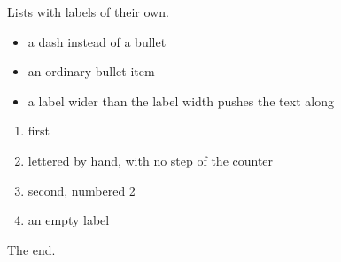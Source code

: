 \documentclass{article}
\begin{document}
Lists with labels of their own.
\begin{itemize}
\item[--] a dash instead of a bullet
\item an ordinary bullet item
\item[Note:] a label wider than the label width pushes the text along
\end{itemize}
\begin{enumerate}
\item first
\item[(a)] lettered by hand, with no step of the counter
\item second, numbered 2
\item[] an empty label
\end{enumerate}
The end.
\end{document}
